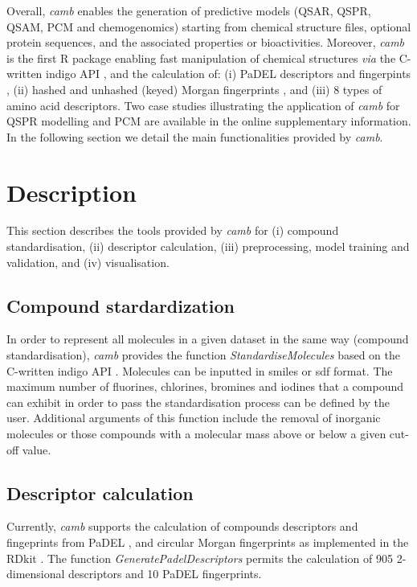 \documentclass{bioinfo}
\begin{document}
Overall, {\it camb} enables the generation of predictive  models (QSAR, QSPR, QSAM, PCM and chemogenomics)
starting from chemical structure files, optional protein sequences, and the associated properties or bioactivities.
Moreover, {\it camb} is the first R package enabling fast manipulation of chemical structures {\it via} the C-written indigo API \citep{indigo}, %
and the calculation of:
(i) PaDEL descriptors and fingerpints \citep{padel},
(ii) hashed and unhashed (keyed) Morgan fingerprints \citep{extended_fp}, %
and (iii) 8 types of amino acid descriptors. %
Two case studies illustrating the application of {\it camb} for
QSPR modelling and PCM are available in the online supplementary information.
In the following section we detail the main functionalities provided by {\it camb}. 

\section{Description}
This section describes the tools provided by {\it camb} 
for (i) compound standardisation, (ii) descriptor calculation, 
(iii) preprocessing, model training and validation, and (iv) visualisation. %

\subsection{Compound stardardization}

In order to represent all molecules in a given dataset in the same 
way (compound standardisation),
{\it camb}  provides the function {\it StandardiseMolecules} based on the C-written indigo API \citep{indigo}.
Molecules can be inputted in smiles or sdf format.
The maximum number of fluorines, chlorines, bromines and iodines 
that a compound can exhibit in order to pass the standardisation process can be defined by the user.
Additional arguments of this function include the removal of inorganic molecules
or those compounds with a molecular mass above or below a given cut-off value.

\subsection{Descriptor calculation} 

Currently, {\it camb} supports the calculation of compounds descriptors and fingeprints from PaDEL \citep{padel},
and circular Morgan fingerprints \citep{extended_fp} as implemented in the RDkit \citep{rdkit}.
The function {\it GeneratePadelDescriptors} permits the calculation of 905 2-dimensional descriptors and 10 PaDEL fingerprints.
\end{document}
